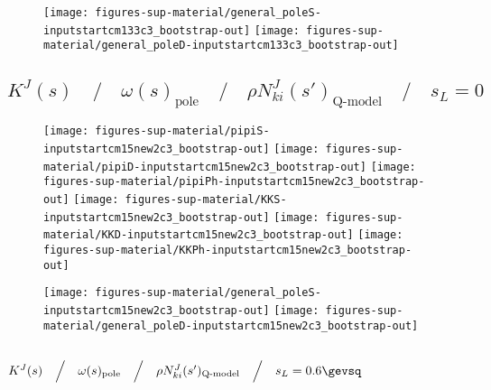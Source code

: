 \begin{figure}[h]
\centering\texttt{[image: figures-sup-material/general\_poleS-inputstartcm133c3\_bootstrap-out]} \texttt{[image: figures-sup-material/general\_poleD-inputstartcm133c3\_bootstrap-out]}
\end{figure}



\clearpage

\subsection{$K^J(s) \quad\Big/\quad \omega(s)_\text{pole} \quad\Big/\quad \rho N^J_{ki}(s')_\text{Q-model} \quad\Big/\quad s_L = 0$}
\label{subsec:inputstartcm15new2c3_bootstrap-out}






\begin{figure}[h]
\centering\texttt{[image: figures-sup-material/pipiS-inputstartcm15new2c3\_bootstrap-out]} \texttt{[image: figures-sup-material/pipiD-inputstartcm15new2c3\_bootstrap-out]} \texttt{[image: figures-sup-material/pipiPh-inputstartcm15new2c3\_bootstrap-out]}
\texttt{[image: figures-sup-material/KKS-inputstartcm15new2c3\_bootstrap-out]} \texttt{[image: figures-sup-material/KKD-inputstartcm15new2c3\_bootstrap-out]} \texttt{[image: figures-sup-material/KKPh-inputstartcm15new2c3\_bootstrap-out]}
\end{figure}

\begin{figure}[h]
\centering\texttt{[image: figures-sup-material/general\_poleS-inputstartcm15new2c3\_bootstrap-out]} \texttt{[image: figures-sup-material/general\_poleD-inputstartcm15new2c3\_bootstrap-out]}
\end{figure}



\clearpage

\subsection{$K^J(s) \quad\Big/\quad \omega(s)_\text{pole} \quad\Big/\quad \rho N^J_{ki}(s')_\text{Q-model} \quad\Big/\quad s_L = 0.6\gevsq$}
\label{subsec:inputstartcm3c3_bootstrap-out}


